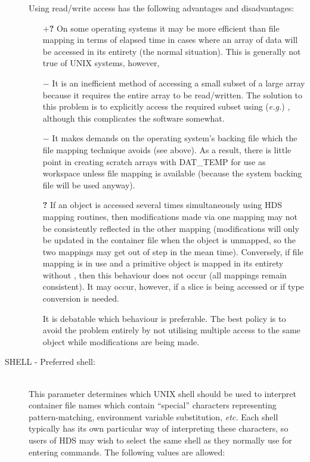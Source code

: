 \documentclass[twoside,11pt]{starlink}
\providecommand{\qt}[1]{``#1''}
\providecommand{\st}[1]{{\emph{#1}}}
\providecommand{\mplus}[0]{{$+$}}
\begin{document}
\begin{description}
\begin{itemize}
\end{itemize}

Using read/write access has the following advantages and
disadvantages:

\begin{itemize}

\item[\textbf{\mplus?}] On some operating systems it may be more efficient than
file mapping in terms of elapsed time in cases where an array of data
will be accessed in its entirety (the normal situation). This is
generally not true of UNIX systems, however,

\item[\textbf{$-$}] It is an inefficient method of accessing a small subset of
a large array because it requires the entire array to be
read/written. The solution to this problem is to explicitly access the
required subset using (\st{e.g.\/}) ,
although this complicates the software somewhat.

\item[\textbf{$-$}] It makes demands on the operating system's backing
file which the file mapping technique avoids (see above). As a result,
there is little point in creating scratch arrays with DAT\_TEMP for
use as workspace unless file mapping is available (because the system
backing file will be used anyway).

\item[\textbf{?}] If an object is accessed several times simultaneously using
HDS mapping routines, then modifications made via one mapping may not
be consistently reflected in the other mapping (modifications will
only be updated in the container file when the object is unmapped, so
the two mappings may get out of step in the mean time). Conversely, if
file mapping is in use and a primitive object is mapped in its
entirety without , then
this behaviour does not occur (all mappings remain consistent). It may
occur, however, if a slice is being accessed or if type conversion is
needed.

It is debatable which behaviour is preferable. The best policy is to
avoid the problem entirely by not utilising multiple access to the
same object while modifications are being made.

\end{itemize}

\item [\xlabel{HDS_SHELL_tuning_parameter}SHELL - Preferred shell:]\mbox{}\\
This parameter determines which UNIX shell should be used to interpret
container file names which contain \qt{special} characters
representing pattern-matching, environment variable substitution,
\st{etc.} Each shell typically has its own particular way of
interpreting these characters, so users of HDS may wish to select the
same shell as they normally use for entering commands. The following
values are allowed:


\end{description}
\end{document}
